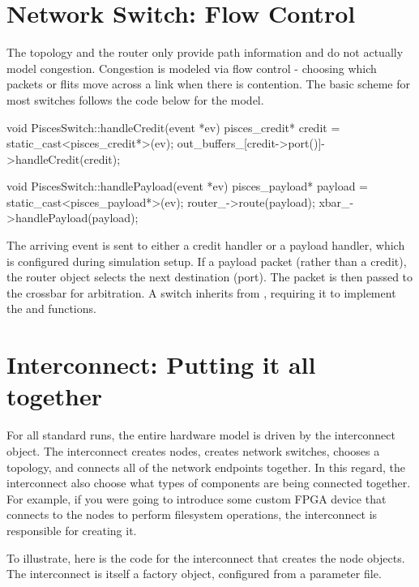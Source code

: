 \section{Network Switch: Flow Control}\label{sec:networkSwitch}
The topology and the router only provide path information and do not actually model congestion.
Congestion is modeled via flow control - choosing which packets or flits move across a link when there is contention.
The basic scheme for most switches follows the code below for the  model.

\begin{CppCode}
void PiscesSwitch::handleCredit(event *ev)
{
  pisces_credit* credit = static_cast<pisces_credit*>(ev);
  out_buffers_[credit->port()]->handleCredit(credit);
}

void PiscesSwitch::handlePayload(event *ev)
{
  pisces_payload* payload = static_cast<pisces_payload*>(ev);
  router_->route(payload);
  xbar_->handlePayload(payload);
}
\end{CppCode}
The arriving event is sent to either a credit handler or a payload handler,
which is configured during simulation setup.
If a payload packet (rather than a credit), the router object selects the next destination (port).
The packet is then passed to the crossbar for arbitration.
A switch inherits from , requiring it to implement the  and  functions.

\section{Interconnect: Putting it all together}\label{sec:topInterconnect}
For all standard runs, the entire hardware model is driven by the interconnect object.
The interconnect creates nodes, creates network switches, chooses a topology, and connects all of the network endpoints together.
In this regard, the interconnect also choose what types of components are being connected together.
For example, if you were going to introduce some custom FPGA device that connects to the nodes to perform filesystem operations,
the interconnect is responsible for creating it.

To illustrate, here is the code for the interconnect that creates the node objects. 
The interconnect is itself a factory object, configured from a parameter file.

